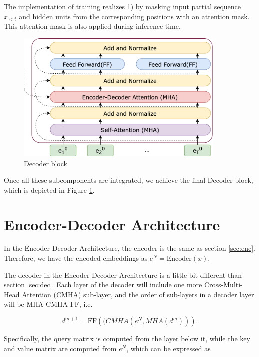 The implementation of training realizes 1) by masking input partial sequence $x_{<t}$ and hidden units from the corresponding positions with an attention mask. This attention mask is also applied during inference time. 

\begin{figure}[h]
    \centering
    \includegraphics[width=10cm]{pages/imgs/decoder_block.png}
    \caption{Decoder block}
    \label{fig:decoder_block}
\end{figure}

Once all these subcomponents are integrated, we achieve the final Decoder block, which is depicted in Figure \ref{fig:decoder_block}.


\section{Encoder-Decoder Architecture}

In the Encoder-Decoder Architecture, the encoder is the same as section \ref{sec:enc}. Therefore, we have the encoded embeddings as $e^N = \mathrm{Encoder}(x)$.

The decoder in the Encoder-Decoder Architecture is a little bit different than section \ref{sec:dec}. Each layer of the decoder will include one more Cross-Multi-Head Attention (CMHA) sub-layer, and the order of sub-layers in a decoder layer will be $\mathrm{MHA}$-$\mathrm{CMHA}$-$\mathrm{FF}$, i.e.

\begin{equation}
    d^{m+1} = \mathrm{FF}(\mathrm(CMHA(e^N, MHA(d^m))).
\end{equation}

Specifically, the query matrix is computed from the layer below it, while the key and value matrix are computed from $e^N$, which can be expressed as

